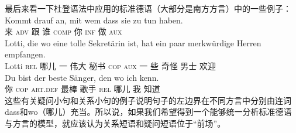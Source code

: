 最后来看一下杜登语法\citep[§1347]{Duden2005-Authors}中应用的标准德语（大部分是南方方言）中的一些例子：
\eal
\ex 
\gll Kommt drauf an, mit wem dass sie zu tun haben.\\
     来 \textsc{adv} \partic{} 跟 谁 \textsc{comp} 你 \textsc{inf} 做 \textsc{aux}\\
\zl
\eal
\ex 
\gll Lotti, die wo eine tolle Sekretärin ist, hat ein paar merkwürdige Herren empfangen.\\
    Lotti  \textsc{rel} 哪儿 一 伟大 秘书 \textsc{cop} \textsc{aux} 一 些 奇怪 男士 欢迎\\
\ex 
\gll Du bist der beste Sänger, den wo ich kenn.\\
     你 \textsc{cop} \textsc{art}.\textsc{def} 最棒 歌手   \textsc{rel} 哪儿 我 知道\\
\zl
这些有关疑问小句和关系小句的例子说明句子的左边界在不同方言中分别由连词dass和wo（哪儿）充当。所以说，如果我们希望得到一个能够统一分析标准德语与方言的模型，就应该认为关系短语和疑问短语位于“前场”。

